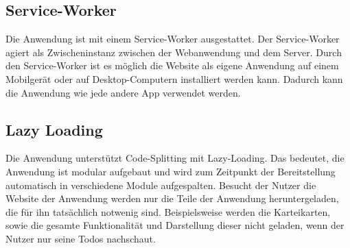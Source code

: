 


\subsection{Service-Worker}
Die Anwendung ist mit einem Service-Worker ausgestattet.
Der Service-Worker agiert als Zwischeninstanz zwischen der Webanwendung und dem Server.
Durch den Service-Worker ist es möglich die Website als eigene Anwendung auf einem Mobilgerät oder auf Desktop-Computern installiert werden kann.
Dadurch kann die Anwendung wie jede andere App verwendet werden.



\subsection{Lazy Loading}
Die Anwendung unterstützt Code-Splitting mit Lazy-Loading.
Das bedeutet, die Anwendung ist modular aufgebaut und wird zum Zeitpunkt der Bereitstellung automatisch in verschiedene Module aufgespalten.
Besucht der Nutzer die Website der Anwendung werden nur die Teile der Anwendung heruntergeladen, die für ihn tatsächlich notwenig sind.
Beispielsweise werden die Karteikarten, sowie die gesamte Funktionalität und Darstellung dieser nicht geladen, wenn der Nutzer nur seine Todos nachschaut.


